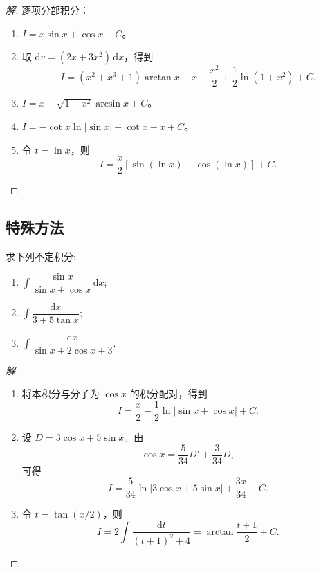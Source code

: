 \documentclass[../../数学分析培优讲义(答案版).tex]{subfiles}
\begin{document}
\begin{proof}[解]
逐项分部积分：
\begin{enumerate}[label=(\arabic*)]
    \item $\displaystyle I=x\sin x+\cos x+C$。
    \item 取 $\mathrm{d}v=(2x+3x^2)\,\mathrm{d}x$，得到
    \[
        I=(x^2+x^3+1)\arctan x-x-\dfrac{x^2}{2}
        +\dfrac{1}{2}\ln(1+x^2)+C.
    \]
    \item $\displaystyle I=x-\sqrt{1-x^2}\arcsin x+C$。
    \item $\displaystyle I=-\cot x\ln|\sin x|-\cot x-x+C$。
    \item 令 $t=\ln x$，则
    \[
        I=\dfrac{x}{2}[\sin(\ln x)-\cos(\ln x)]+C.
    \]
\end{enumerate}
\end{proof}

\subsection{特殊方法}


\begin{example}
求下列不定积分:
\begin{enumerate}[label=(\arabic*)]
    \item $\displaystyle\int\dfrac{\sin x}{\sin x+\cos x}\,\mathrm{d}x$;
    \item $\displaystyle\int\dfrac{\mathrm{d}x}{3+5\tan x}$;
    \item $\displaystyle\int\dfrac{\mathrm{d}x}{\sin x+2\cos x+3}$.
\end{enumerate}
\end{example}

\begin{proof}[解]
\begin{enumerate}[label=(\arabic*)]
    \item 将本积分与分子为 $\cos x$ 的积分配对，得到
    \[
        I=\dfrac{x}{2}-\dfrac{1}{2}\ln|\sin x+\cos x|+C.
    \]
    \item 设 $D=3\cos x+5\sin x$。由
    \[
        \cos x=\dfrac{5}{34}D'+\dfrac{3}{34}D,
    \]
    可得
    \[
        I=\dfrac{5}{34}\ln|3\cos x+5\sin x|+\dfrac{3x}{34}+C.
    \]
    \item 令 $t=\tan(x/2)$，则
    \[
        I=2\int\dfrac{\mathrm{d}t}{(t+1)^2+4}
        =\arctan\dfrac{t+1}{2}+C.
    \]
\end{enumerate}
\end{proof}
\end{document}
